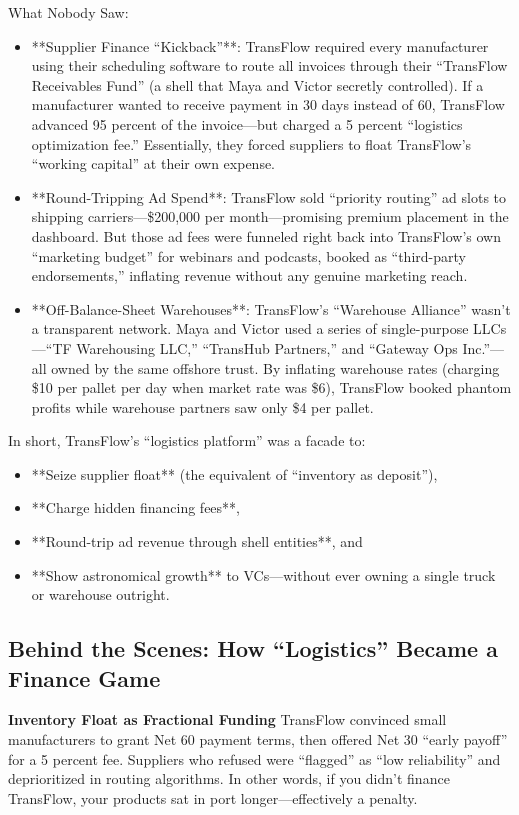 What Nobody Saw:
\begin{itemize}
    \item **Supplier Finance “Kickback”**: TransFlow required every manufacturer using their scheduling software to route all invoices through their “TransFlow Receivables Fund” (a shell that Maya and Victor secretly controlled). If a manufacturer wanted to receive payment in 30 days instead of 60, TransFlow advanced 95 percent of the invoice—but charged a 5 percent “logistics optimization fee.” Essentially, they forced suppliers to float TransFlow’s “working capital” at their own expense.
    \item **Round-Tripping Ad Spend**: TransFlow sold “priority routing” ad slots to shipping carriers—\$200,000 per month—promising premium placement in the dashboard. But those ad fees were funneled right back into TransFlow’s own “marketing budget” for webinars and podcasts, booked as “third-party endorsements,” inflating revenue without any genuine marketing reach.
    \item **Off-Balance-Sheet Warehouses**: TransFlow’s “Warehouse Alliance” wasn’t a transparent network. Maya and Victor used a series of single-purpose LLCs—“TF Warehousing LLC,” “TransHub Partners,” and “Gateway Ops Inc.”—all owned by the same offshore trust. By inflating warehouse rates (charging \$10 per pallet per day when market rate was \$6), TransFlow booked phantom profits while warehouse partners saw only \$4 per pallet.
\end{itemize}

In short, TransFlow’s “logistics platform” was a facade to:
\begin{itemize}
    \item **Seize supplier float** (the equivalent of “inventory as deposit”),
    \item **Charge hidden financing fees**,
    \item **Round-trip ad revenue through shell entities**, and
    \item **Show astronomical growth** to VCs—without ever owning a single truck or warehouse outright.
\end{itemize}


\subsection{Behind the Scenes: How “Logistics” Became a Finance Game}

\textbf{Inventory Float as Fractional Funding}
   TransFlow convinced small manufacturers to grant Net 60 payment terms, then offered Net 30 “early payoff” for a 5 percent fee. Suppliers who refused were “flagged” as “low reliability” and deprioritized in routing algorithms. In other words, if you didn’t finance TransFlow, your products sat in port longer—effectively a penalty.


